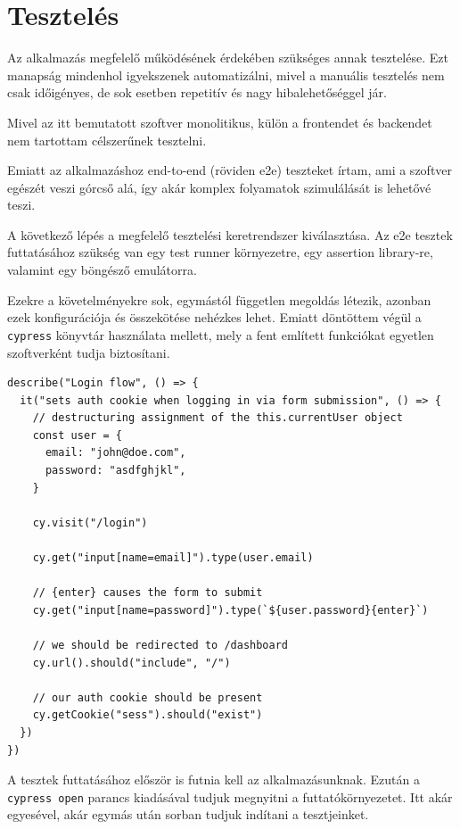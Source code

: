 \chapter{Tesztelés}

Az alkalmazás megfelelő működésének érdekében szükséges annak tesztelése.
Ezt manapság mindenhol igyekszenek automatizálni, mivel a manuális tesztelés nem csak időigényes, de sok esetben
repetitív és nagy hibalehetőséggel jár.

Mivel az itt bemutatott szoftver monolitikus, külön a frontendet és backendet nem tartottam célszerűnek tesztelni.

Emiatt az alkalmazáshoz end-to-end (röviden e2e) teszteket írtam, ami a szoftver egészét veszi górcső alá, így akár komplex folyamatok
szimulálását is lehetővé teszi.

A következő lépés a megfelelő tesztelési keretrendszer kiválasztása. Az e2e tesztek futtatásához szükség van egy test runner környezetre, egy assertion library-re, valamint egy böngésző emulátorra.

Ezekre a követelményekre sok, egymástól független megoldás létezik, azonban ezek konfigurációja és összekötése nehézkes lehet.
Emiatt döntöttem végül a \lstinline|cypress| könyvtár használata mellett, mely a fent említett funkciókat egyetlen szoftverként
tudja biztosítani.

\begin{lstlisting}[caption=Bejelentkezés tesztelése]
describe("Login flow", () => {
  it("sets auth cookie when logging in via form submission", () => {
    // destructuring assignment of the this.currentUser object
    const user = {
      email: "john@doe.com",
      password: "asdfghjkl",
    }

    cy.visit("/login")

    cy.get("input[name=email]").type(user.email)

    // {enter} causes the form to submit
    cy.get("input[name=password]").type(`${user.password}{enter}`)

    // we should be redirected to /dashboard
    cy.url().should("include", "/")

    // our auth cookie should be present
    cy.getCookie("sess").should("exist")
  })
})
\end{lstlisting}

A tesztek futtatásához először is futnia kell az alkalmazásunknak. Ezután a \lstinline|cypress open| parancs kiadásával
tudjuk megnyitni a futtatókörnyezetet. Itt akár egyesével, akár egymás után sorban tudjuk indítani a tesztjeinket.

